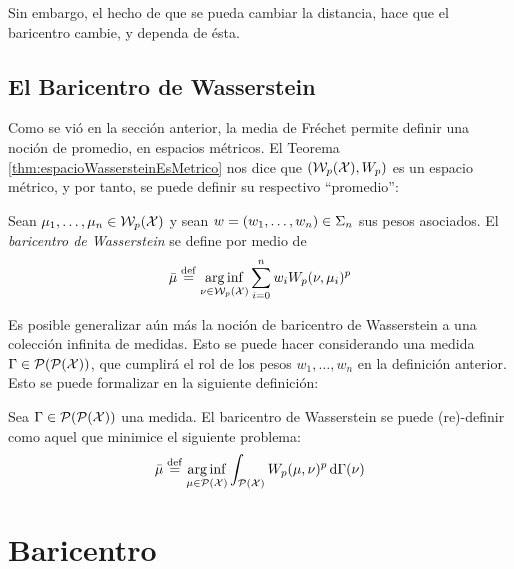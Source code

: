 {{{\begin{remark}
			  Sin embargo, el hecho de que se pueda cambiar la distancia, hace que el baricentro cambie, y dependa de ésta.
		  \end{remark}



	  }  %

	  \subsection*{El Baricentro de Wasserstein}\label{ssec:el-baricentro-de-Wasserstein}
	  {
		  Como se vió en la sección anterior, la media de Fréchet permite definir una noción de promedio, en espacios métricos. El Teorema \ref{thm:espacioWassersteinEsMetrico} nos dice que $(\WassersteinSpace[p]{\cX}, W_p)$ es un espacio métrico, y por tanto, se puede definir su respectivo ``promedio'':
		  \begin{definition}
			  Sean $\mu_1,\ldots, \mu_n \in \WassersteinSpace[p]{\cX} $ y sean $w = (w_1,\ldots, w_n) \in \Simplex[n]$ sus pesos asociados. El \emph{baricentro de Wasserstein} se define por medio de
			  \begin{equation}
				  \bar \mu \eqdef \arginf_{\nu \in \WassersteinSpace[p]{\cX} } \sum_{i=0}^{n} w_i \Wasserstein[p]{\nu}{\mu_i}^p
			  \end{equation}

		  \end{definition}

		  Es posible generalizar aún más la noción de baricentro de Wasserstein a una colección infinita de medidas. Esto se puede hacer considerando una medida $\Gamma \in \ProbSpace[\ProbSpace ] $, que cumplirá el rol de los pesos $w_1,\ldots, w_n $ en la definición anterior. Esto se puede formalizar en la siguiente definición:

		  \begin{definition}
			  Sea $\Gamma \in \ProbSpace[\ProbSpace]$ una medida. El baricentro de Wasserstein se puede (re)-definir como aquel que minimice el siguiente problema:
			  \begin{equation}
				  \bar \mu \eqdef \arginf_{\mu \in \ProbSpace} \int_{\ProbSpace} \Wasserstein[p]{\mu}{\nu}^p \dd{\Gamma(\nu)}
			  \end{equation}

		  \end{definition}


	  }  %



  }  %

  \section{Baricentro }\label{sec:baricentro-}
  {
  }  %
  {

  }  %
 }